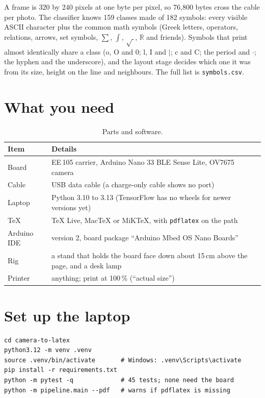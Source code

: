 \documentclass[11pt]{article}
\newcommand{\cmd}[1]{\texttt{#1}}
\begin{document}
A frame is 320 by 240 pixels at one byte per pixel, so 76{,}800 bytes cross the cable per photo.
The classifier knows 159 classes made of 182 symbols: every visible ASCII character plus the common
math symbols (Greek letters, operators, relations, arrows, set symbols, $\sum$, $\int$, $\sqrt{\ }$,
$\mathbb{R}$ and friends). Symbols that print almost identically share a class (o, O and 0; l, I
and $|$; c and C; the period and $\cdot$; the hyphen and the underscore), and the layout stage
decides which one it was from its size, height on the line and neighbours. The full list is
\cmd{symbols.csv}.

\section{What you need}

\begin{table}[H]
\centering
\begin{tabular}{C{3.0cm}C{8.6cm}}
\toprule
\textbf{Item} & \textbf{Details} \\
\midrule
Board & EE\,105 carrier, Arduino Nano 33 BLE Sense Lite, OV7675 camera \\
Cable & USB data cable (a charge-only cable shows no port) \\
Laptop & Python 3.10 to 3.13 (TensorFlow has no wheels for newer versions yet) \\
\TeX{} & TeX Live, MacTeX or MiKTeX, with \cmd{pdflatex} on the path \\
Arduino IDE & version 2, board package ``Arduino Mbed OS Nano Boards'' \\
Rig & a stand that holds the board face down about 15\,cm above the page, and a desk lamp \\
Printer & anything; print at 100\,\% (``actual size'') \\
\bottomrule
\end{tabular}
\caption{Parts and software.}
\end{table}

\section{Set up the laptop}

\begin{lstlisting}
cd camera-to-latex
python3.12 -m venv .venv
source .venv/bin/activate       # Windows: .venv\Scripts\activate
pip install -r requirements.txt
python -m pytest -q             # 45 tests; none need the board
python -m pipeline.main --pdf   # warns if pdflatex is missing
\end{lstlisting}
\end{document}
